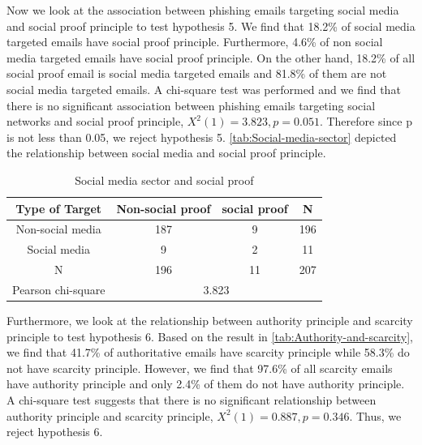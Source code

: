Now we look at the association between phishing emails targeting social
media and social proof principle to test hypothesis 5. We find that
18.2\% of social media targeted emails have social proof principle.
Furthermore, 4.6\% of non social media targeted emails have social
proof principle. On the other hand, 18.2\% of all social proof email
is social media targeted emails and 81.8\% of them are not social
media targeted emails. A chi-square test was performed and we find
that there is no significant association between phishing emails targeting
social networks and social proof principle, $X^{2}(1)=3.823,p=0.051$.
Therefore since p is not less than 0.05, we reject hypothesis 5. \autoref{tab:Social-media-sector}
depicted the relationship between social media and social proof principle.

\begin{minipage}[t]{1\columnwidth}%
\begin{longtable}{cccc}
\caption{\label{tab:Social-media-sector}Social media sector and social proof}
\tabularnewline
\toprule 
{\footnotesize{}Type of Target} & {\footnotesize{}Non-social proof} & {\footnotesize{}social proof} & \multirow{1}{*}{{\footnotesize{}N}}\tabularnewline
\midrule 
\multirow{1}{*}{{\footnotesize{}Non-social media}} & {\footnotesize{}187} & {\footnotesize{}9} & \multirow{1}{*}{{\footnotesize{}196}}\tabularnewline
\midrule 
\multirow{1}{*}{{\footnotesize{}Social media}} & {\footnotesize{}9} & {\footnotesize{}2} & \multirow{1}{*}{{\footnotesize{}11}}\tabularnewline
\midrule
\midrule 
{\footnotesize{}N} & {\footnotesize{}196} & {\footnotesize{}11} & {\footnotesize{}207}\tabularnewline
\midrule
\midrule 
{\footnotesize{}Pearson chi-square} & \multicolumn{3}{c}{{\footnotesize{}3.823}}\tabularnewline
\midrule
\end{longtable}%
\end{minipage}

Furthermore, we look at the relationship between authority principle
and scarcity principle to test hypothesis 6. Based on the result in
\autoref{tab:Authority-and-scarcity}, we find that 41.7\% of authoritative
emails have scarcity principle while 58.3\% do not have scarcity principle.
However, we find that 97.6\% of all scarcity emails have authority
principle and only 2.4\% of them do not have authority principle.
A chi-square test suggests that there is no significant relationship
between authority principle and scarcity principle, $X^{2}(1)=0.887,p=0.346$.
Thus, we reject hypothesis 6.

